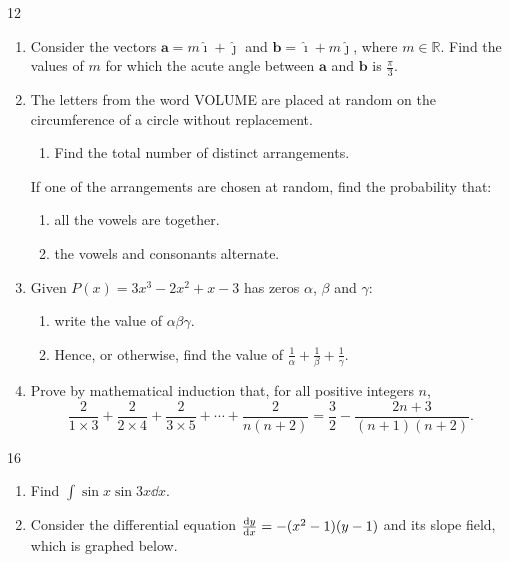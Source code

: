 \documentclass[12pt]{extarticle}
\begin{document}
\begin{shortanswer}
	\begin{bookletquestion}{12}
		\begin{enumerate}
			\item {} Consider the vectors $\mathbf{a}=m\boldsymbol{\hat{\imath}}+\boldsymbol{\hat{\jmath}}$ and $\mathbf{b}=\boldsymbol{\hat{\imath}}+m\boldsymbol{\hat{\jmath}}$, where $m\in\mathbb{R}$.
			      Find the values of $m$ for which the acute angle between $\mathbf{a}$ and $\mathbf{b}$ is $\frac{\pi}{3}$.
			\item The letters from the word VOLUME are placed at random on the circumference of a circle without replacement.
			      \begin{enumerate}
				      \item {} Find the total number of distinct arrangements.
			      \end{enumerate}
			      If one of the arrangements are chosen at random, find the probability that:
			      \begin{enumerate}[resume]
				      \item {} all the vowels are together.
				      \item {} the vowels and consonants alternate.
			      \end{enumerate}
			\item Given $P(x)=3x^3-2x^2+x-3$ has zeros $\alpha$, $\beta$ and $\gamma$:
			      \begin{enumerate}
				      \item {} write the value of $\alpha\beta\gamma$.
				      \item {} Hence, or otherwise, find the value of $\frac{1}{\alpha}+\frac{1}{\beta}+\frac{1}{\gamma}$.
			      \end{enumerate}
			\item {} Prove by mathematical induction that, for all positive integers $n$,
			      \[\dfrac{2}{1\times 3}+\dfrac{2}{2\times 4}+\dfrac{2}{3\times 5}+\cdots+\dfrac{2}{n(n+2)}=\dfrac{3}{2}-\dfrac{2n+3}{(n+1)(n+2)}.\]
		\end{enumerate}
		\questionend
	\end{bookletquestion}
	\pagebreak
	\begin{bookletquestion}{16}
		\begin{enumerate}
			\item {} Find $\int\sin x \sin 3x \dd{x}$.
			\item Consider the differential equation $\dv{y}{x}=-(x^2-1)(y-1)$ and its slope field, which is graphed below.

\end{enumerate}
\end{bookletquestion}
\end{shortanswer}
\end{document}
